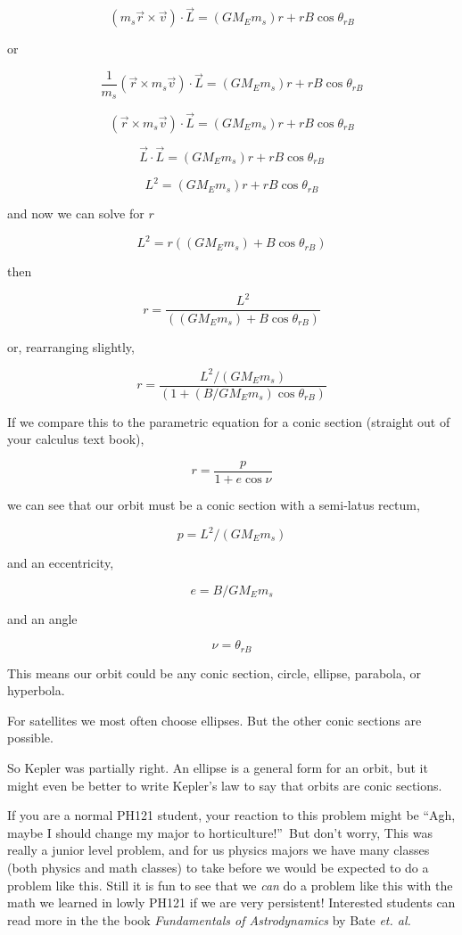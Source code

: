 $$\left( m_{s}\overrightarrow{r}\times \overrightarrow{v}\right) \cdot \overrightarrow{L}=\left( GM_{E}m_{s}\right) r+rB\cos \theta _{rB} 
$$

or

$$\frac{1}{m_{s}}\left( \overrightarrow{r}\times m_{s}\overrightarrow{v}\right) \cdot \overrightarrow{L}=\left( GM_{E}m_{s}\right) r+rB\cos \theta_{rB}
$$

$$\left( \overrightarrow{r}\times m_{s}\overrightarrow{v}\right) \cdot \overrightarrow{L}=\left( GM_{E}m_{s}\right) r+rB\cos \theta _{rB} 
$$

$$\overrightarrow{L}\cdot \overrightarrow{L}=\left( GM_{E}m_{s}\right)r+rB\cos \theta _{rB} 
$$

$$L^{2}=\left( GM_{E}m_{s}\right) r+rB\cos \theta _{rB} 
$$

and now we can solve for $r$%

$$L^{2}=r\left( \left( GM_{E}m_{s}\right) +B\cos \theta _{rB}\right) 
$$

then 

$$r=\frac{L^{2}}{\left( \left( GM_{E}m_{s}\right) +B\cos \theta _{rB}\right) } 
$$

or, rearranging slightly, 

$$r=\frac{L^{2}/\left( GM_{E}m_{s}\right) }{\left( 1+\left(B/GM_{E}m_{s}\right) \cos \theta _{rB}\right) } $$

If we compare this to the parametric equation for a conic section (straight out of your calculus text book), 

$$r=\frac{p}{1+e\cos \nu } $$

we can see that our orbit must be a conic section with a semi-latus rectum, 

$$p=L^{2}/\left( GM_{E}m_{s}\right) $$

and an eccentricity, 
 
$$e=B/GM_{E}m_{s}$$

and an angle 

$$\nu =\theta _{rB}$$

This means our orbit could be any conic section, circle, ellipse, parabola, or hyperbola.

For satellites we most often choose ellipses. But the other conic sections are possible.

So Kepler was partially right. An ellipse is a general form for an orbit, but it might even be better to write Kepler's law to say that orbits are conic sections.


If you are a normal PH121 student, your reaction to this problem might be \textquotedblleft Agh, maybe I should change my major to
horticulture!\textquotedblright\ But don't worry, This was really a junior level problem, and for us physics majors we have many classes (both physics and math classes) to take before we would be expected to do a problem like this. Still it is fun to see that we \emph{can} do a problem like this with the math we learned in lowly PH121 if we are very persistent!  Interested students can read more in the the book \textit{Fundamentals of Astrodynamics} by Bate \textit{et. al.} \cite{Bate1971}
	
